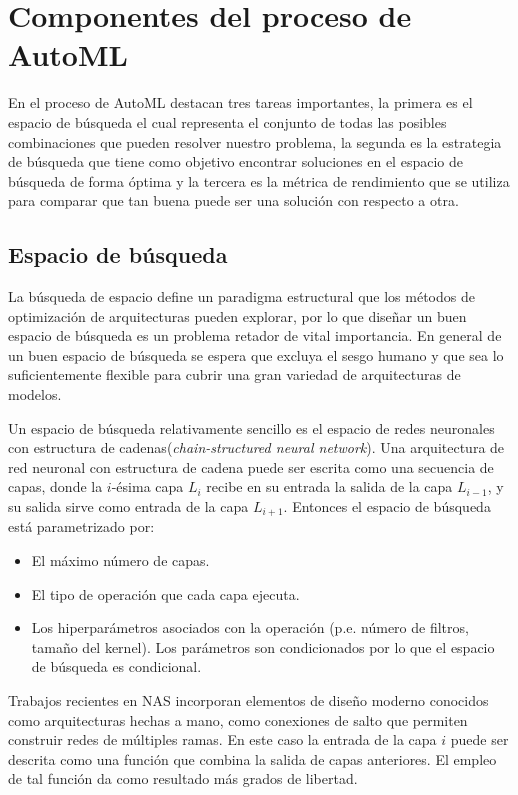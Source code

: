 \section{Componentes del proceso de AutoML}
En el proceso de AutoML destacan tres tareas importantes, la primera es el espacio de búsqueda el cual representa el conjunto de todas las posibles combinaciones que pueden resolver nuestro problema, la segunda es la estrategia de búsqueda que tiene como objetivo encontrar soluciones en el espacio de búsqueda de forma óptima y la tercera es la métrica de rendimiento que se utiliza para comparar que tan buena puede ser una solución con respecto a otra.

\subsection{Espacio de búsqueda}
La búsqueda de espacio define un paradigma estructural que los métodos de optimización de arquitecturas pueden explorar, por lo que diseñar un buen espacio de búsqueda es un problema retador de vital importancia. En general de un buen espacio de búsqueda se espera que excluya el sesgo humano y que sea lo suficientemente flexible para cubrir una gran variedad de arquitecturas de modelos.

Un espacio de búsqueda relativamente sencillo es el espacio de redes neuronales con estructura de cadenas(\textit{chain-structured neural network}). Una arquitectura de red neuronal con estructura de cadena puede ser escrita como una secuencia de capas, donde la $i$-ésima capa $L_i$ recibe en su entrada la salida de la capa $L_{i-1}$, y su salida sirve como entrada de la capa $L_{i + 1}$. Entonces el espacio de búsqueda está parametrizado por:

\begin{itemize}
\item El máximo número de capas.
\item El tipo de operación que cada capa ejecuta.
\item Los hiperparámetros asociados con la operación (p.e. número de filtros, tamaño del kernel). Los parámetros son condicionados por lo que el espacio de búsqueda es condicional.
\end{itemize}

Trabajos recientes en NAS \parencite{56, 65, 66, 67, 68} incorporan elementos de diseño moderno conocidos como arquitecturas hechas a mano, como conexiones de salto que permiten construir redes de múltiples ramas. En este caso la entrada de la capa $i$ puede ser descrita como una función que combina la salida de capas anteriores. El empleo de tal función da como resultado más grados de libertad.\\

